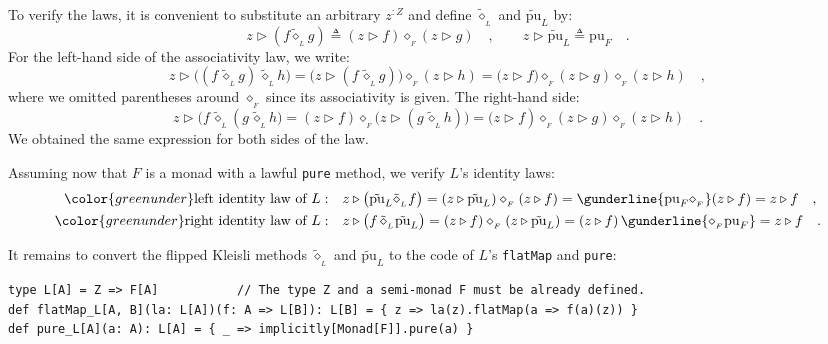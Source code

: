 To verify the laws, it is convenient to substitute an arbitrary $z^{:Z}$
and define $\tilde{\diamond}_{_{L}}$ and $\tilde{\text{pu}}_{L}$
by:
\[
z\triangleright(f\tilde{\diamond}_{_{L}}g)\triangleq(z\triangleright f)\diamond_{_{F}}(z\triangleright g)\quad,\quad\quad z\triangleright\tilde{\text{pu}}_{L}\triangleq\text{pu}_{F}\quad.
\]
For the left-hand side of the associativity law, we write:
\[
z\triangleright\big((f\,\tilde{\diamond}_{_{L}}g)\,\tilde{\diamond}_{_{L}}h\big)=\big(z\triangleright(f\,\tilde{\diamond}_{_{L}}g)\big)\diamond_{_{F}}(z\triangleright h)=\big(z\triangleright f)\diamond_{_{F}}(z\triangleright g)\diamond_{_{F}}(z\triangleright h)\quad,
\]
where we omitted parentheses around $\diamond_{_{F}}$ since its associativity
is given. The right-hand side:
\[
z\triangleright\big(f\,\tilde{\diamond}_{_{L}}(g\,\tilde{\diamond}_{_{L}}h\big)=(z\triangleright f)\diamond_{_{F}}\big(z\triangleright(g\,\tilde{\diamond}_{_{L}}h)\big)=\big(z\triangleright f)\diamond_{_{F}}(z\triangleright g)\diamond_{_{F}}(z\triangleright h)\quad.
\]
We obtained the same expression for both sides of the law.

Assuming now that $F$ is a monad with a lawful \lstinline!pure!
method, we verify $L$\textsf{'}s identity laws:
\begin{align*}
{\color{greenunder}\text{left identity law of }L:}\quad & z\triangleright\big(\tilde{\text{pu}}_{L}\tilde{\diamond}_{_{L}}f\big)=(z\triangleright\tilde{\text{pu}}_{L})\diamond_{_{F}}(z\triangleright f)=\gunderline{\text{pu}_{F}\diamond_{_{F}}}(z\triangleright f)=z\triangleright f\quad,\\
{\color{greenunder}\text{right identity law of }L:}\quad & z\triangleright\big(f\,\tilde{\diamond}_{_{L}}\tilde{\text{pu}}_{L}\big)=(z\triangleright f)\diamond_{_{F}}(z\triangleright\tilde{\text{pu}}_{L})=(z\triangleright f)\,\gunderline{\diamond_{_{F}}\text{pu}_{F}}=z\triangleright f\quad.
\end{align*}

It remains to convert the flipped Kleisli methods $\tilde{\diamond}_{_{L}}$
and $\tilde{\text{pu}}_{L}$ to the code of $L$\textsf{'}s \lstinline!flatMap!
and \lstinline!pure!:
\begin{lstlisting}
type L[A] = Z => F[A]           // The type Z and a semi-monad F must be already defined.
def flatMap_L[A, B](la: L[A])(f: A => L[B]): L[B] = { z => la(z).flatMap(a => f(a)(z)) }
def pure_L[A](a: A): L[A] = { _ => implicitly[Monad[F]].pure(a) }
\end{lstlisting}


